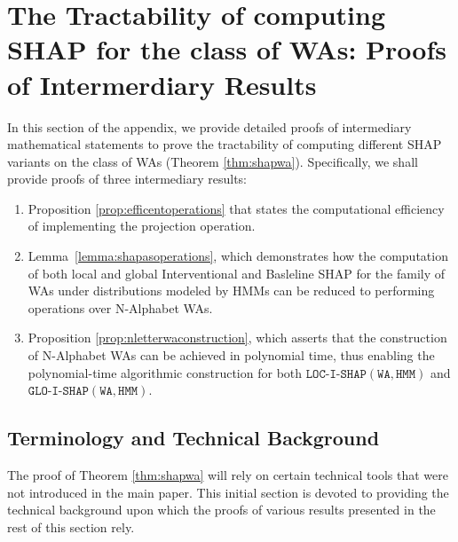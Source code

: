 \section{The Tractability of computing SHAP for the class of WAs: Proofs of Intermerdiary Results} \label{app:shapwa}

In this section of the appendix, we provide detailed proofs of intermediary mathematical statements to prove the tractability of computing different SHAP variants on the class of WAs (Theorem \ref{thm:shapwa}). Specifically, we shall provide proofs of three intermediary results: 
\begin{enumerate}
    \item Proposition \ref{prop:efficentoperations} that states the computational efficiency of implementing the projection operation. 
    \item Lemma~\ref{lemma:shapasoperations}, which demonstrates how the computation of both local and global Interventional and Basleline SHAP for the family of WAs under distributions modeled by HMMs can be reduced to performing operations over N-Alphabet WAs.
    \item Proposition \ref{prop:nletterwaconstruction}, which asserts that the construction of N-Alphabet WAs can be achieved in polynomial time, thus enabling the polynomial-time algorithmic construction for both $\texttt{LOC-I-SHAP}(\texttt{WA}, \texttt{HMM})$ and $\texttt{GLO-I-SHAP}(\texttt{WA}, \texttt{HMM})$.
\end{enumerate}

\subsection{Terminology and Technical Background}
The proof of Theorem \ref{thm:shapwa} will rely on certain technical tools that were not introduced in the main paper. This initial section is devoted to providing the technical background upon which the proofs of various results presented in the rest of this section rely.

